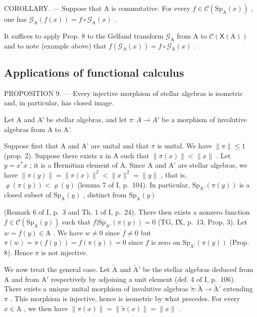 COROLLARY. --- Suppose that A is commutative. For every \(f \in \mathcal{C}(\mathrm{Sp}_{\mathrm{A}}(x))\) , one has \(\mathcal{G}_{\mathrm{A}}(f(x)) = f \circ \mathcal{G}_{\mathrm{A}}(x)\) .

It suffices to apply Prop. 8 to the Gelfand transform \(\mathcal{G}_{\mathrm{A}}\) from A to \(\mathcal{C}(\mathsf{X}(\mathrm{A}))\) and to note (example above) that \(f(\mathcal{G}_{\mathrm{A}}(x)) = f \circ \mathcal{G}_{\mathrm{A}}(x)\) .

\subsection{Applications of functional calculus}

PROPOSITION 9. --- Every injective morphism of stellar algebras is isometric and, in particular, has closed image.

Let A and A′ be stellar algebras, and let \(\pi\colon A\to A'\) be a morphism of involutive algebras from A to A'.

Suppose first that A and A' are unital and that \(\pi\) is unital. We have \(\|\pi\| \leqslant 1\) (prop. 2). Suppose there exists x in A such that \(\|\pi(x)\| < \|x\|\) . Let \(y = x^{*}x\) ; it is a Hermitian element of A. Since A and A' are stellar algebras, we have \(\|\pi(y)\| = \|\pi(x)\|^{2} < \|x\|^{2} = \|y\|\) , that is, \(\varrho(\pi(y)) < \varrho(y)\) (lemma 7 of I, p.~104). In particular, \(\mathrm{Sp}_{\mathrm{A}'}(\pi(y))\) is a closed subset of \(\mathrm{Sp}_{\mathrm{A}}(y)\) , distinct from \(\mathrm{Sp}_{\mathrm{A}}(y)\)

(Remark 6 of I, p.~3 and Th. 1 of I, p.~24). There then exists a nonzero function \(f \in \mathcal{C}(\mathrm{Sp}_{\mathrm{A}}(y))\) such that \(f| \mathrm{Sp}_{\mathrm{A}'}(\pi(y)) = 0\) (TG, IX, p.~13, Prop. 3). Let \(w = f(y) \in \mathrm{A}\) . We have \(w \neq 0\) since \(f \neq 0\) but \(\pi(w) = \pi(f(y)) = f(\pi(y)) = 0\) since \(f\) is zero on \(\mathrm{Sp}_{\mathrm{A}'}(\pi(y))\) (Prop. 8). Hence \(\pi\) is not injective.

We now treat the general case. Let \(\widetilde{\mathrm{A}}\) and \(\widetilde{\mathrm{A}}'\) be the stellar algebras deduced from A and from \(\mathrm{A}'\) respectively by adjoining a unit element (def. 4 of I, p.~106). There exists a unique unital morphism of involutive algebras \(\widetilde{\pi}\colon \widetilde{\mathrm{A}}\to \widetilde{\mathrm{A}}'\) extending \(\pi\) . This morphism is injective, hence is isometric by what precedes. For every \(x\in \mathrm{A}\) , we then have \(\| \pi (x)\| = \| \widetilde{\pi} (x)\| = \| x\|\) .

